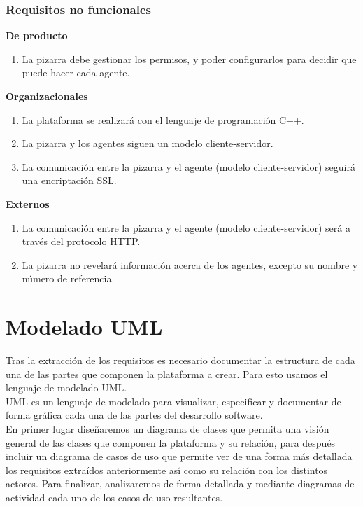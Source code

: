 \subsubsection{Requisitos no funcionales}
\textbf{De producto}
	\begin{enumerate}
		\item La pizarra debe gestionar los permisos, y poder configurarlos para decidir que puede hacer cada agente.
	\end{enumerate}
\textbf{Organizacionales}
	\begin{enumerate}
		\item La plataforma se realizará con el lenguaje de programación C++.
		\item La pizarra y los agentes siguen un modelo cliente-servidor.
		\item La comunicación entre la pizarra y el agente (modelo cliente-servidor) seguirá una encriptación SSL.
	\end{enumerate}
\textbf{Externos}
	\begin{enumerate}
		\item La comunicación entre la pizarra y el agente (modelo cliente-servidor) será a través del protocolo HTTP.
		\item La pizarra no revelará información acerca de los agentes, excepto su nombre y número de referencia.
	\end{enumerate}
	
\section{Modelado UML}
Tras la extracción de los requisitos es necesario documentar la estructura de cada una de las partes que componen la plataforma a crear. Para esto usamos el lenguaje de modelado UML.\\

UML es un lenguaje de modelado para visualizar, especificar y documentar de forma gráfica cada una de las partes del desarrollo software. \\

En primer lugar diseñaremos un diagrama de clases que permita una visión general de las clases que componen la plataforma y su relación, para después incluir un diagrama de casos de uso que permite ver de una forma más detallada los requisitos extraídos anteriormente así como su relación con los distintos actores. Para finalizar, analizaremos de forma detallada y mediante diagramas de actividad cada uno de los casos de uso resultantes.\\


